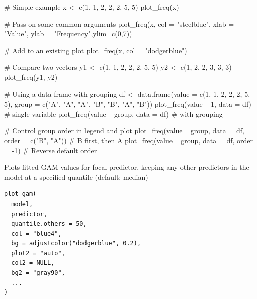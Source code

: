 \documentclass[a4paper]{book}
\begin{document}
%
\begin{Examples}
\begin{ExampleCode}
# Simple example
x <- c(1, 1, 2, 2, 2, 5, 5)
plot_freq(x)

# Pass on some common  arguments
plot_freq(x, col = "steelblue", xlab = "Value", ylab = "Frequency",ylim=c(0,7))

# Add to an existing plot
plot_freq(x, col = "dodgerblue")


# Compare two vectors
y1 <- c(1, 1, 2, 2, 2, 5, 5)
y2 <- c(1, 2, 2, 3, 3, 3)
plot_freq(y1, y2)

# Using a data frame with grouping
df <- data.frame(value = c(1, 1, 2, 2, 2, 5, 5), group = c("A", "A", "A", "B", "B", "A", "B"))
plot_freq(value ~ 1, data = df)  # single variable
plot_freq(value ~ group, data = df)  # with grouping

# Control group order in legend and plot
plot_freq(value ~ group, data = df, order = c("B", "A"))  # B first, then A
plot_freq(value ~ group, data = df, order = -1)  # Reverse default order

\end{ExampleCode}
\end{Examples}
%
\begin{Description}
Plots fitted GAM values for focal predictor,
keeping any other predictors in the model at a specified quantile  (default: median)
\end{Description}
%
\begin{Usage}
\begin{verbatim}
plot_gam(
  model,
  predictor,
  quantile.others = 50,
  col = "blue4",
  bg = adjustcolor("dodgerblue", 0.2),
  plot2 = "auto",
  col2 = NULL,
  bg2 = "gray90",
  ...
)
\end{verbatim}
\end{Usage}
%
\end{document}
